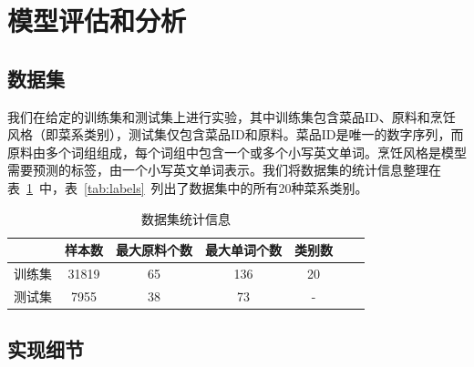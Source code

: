 \section{模型评估和分析}

\subsection{数据集}

我们在给定的训练集和测试集上进行实验，其中训练集包含菜品ID、原料和烹饪风格（即菜系类别），测试集仅包含菜品ID和原料。菜品ID是唯一的数字序列，而原料由多个词组组成，每个词组中包含一个或多个小写英文单词。烹饪风格是模型需要预测的标签，由一个小写英文单词表示。我们将数据集的统计信息整理在表~\ref{tab:dataset}~中，表~\ref{tab:labels}~列出了数据集中的所有20种菜系类别。

\begin{table}[htbp]
    \centering
    \begin{tabular}{ccccccc}
        \toprule
         & 样本数 & 最大原料个数 & 最大单词个数 & 类别数 \\
        \midrule
        训练集 & 31819 & 65 & 136 & 20 \\
        测试集 & 7955 & 38 & 73 & - \\
        \bottomrule
    \end{tabular}
    \caption{数据集统计信息}
    \label{tab:dataset}
\end{table}

\begin{table}[htbp]
    \centering
    \caption{全部菜系类别}
    \label{tab:labels}
\end{table}

\subsection{实现细节}

